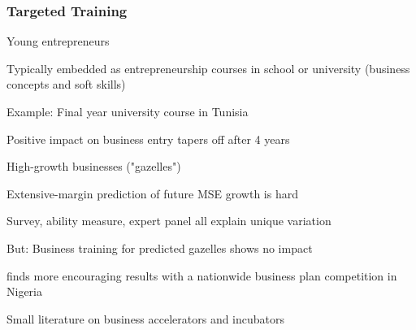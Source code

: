 \documentclass[hideothersubsections, usenames,dvipsnames,11pt]{beamer}
\newenvironment{itemize_2pt}{\itemize\addtolength{\itemsep}{2pt}}{\enditemize}
\begin{document}
\begin{frame}
\frametitle{Targeted Training}
	Young entrepreneurs
	\begin{itemize_2pt}
		\item Typically embedded as \textcolor{bdf}{entrepreneurship courses in school or university} (business concepts and soft skills)
		\item Example: Final year university course in Tunisia \citep{Alaref2020}
		\begin{itemize_2pt}
			\item Positive impact on business entry tapers off after 4 years
		\end{itemize_2pt}
	\end{itemize_2pt}
	
\pause

\vspace{1.0em}

High-growth businesses ("gazelles")
\begin{itemize_2pt}
	\item Extensive-margin prediction of future MSE growth is hard \citep{Fafchamps2017}
	\begin{itemize_2pt}
		\item Survey, ability measure, expert panel all explain unique variation
		\item But: Business training for predicted gazelles shows no impact
	\end{itemize_2pt} 
	
	\item \citet{McKenzie2017a} finds more encouraging results with a nationwide business plan competition in Nigeria
	
	\item Small literature on business accelerators and incubators
	\begin{itemize_2pt}
		\item \citet{Cusolito2021, GonzalezUribe2018, GonzalezUribe2021}
	\end{itemize_2pt}
\end{itemize_2pt}
	
\end{frame}

\end{document}
